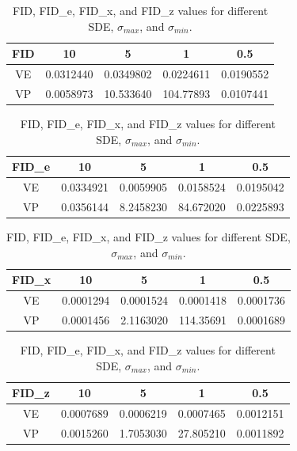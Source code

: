 \begin{table}[h]
    \centering
    \renewcommand{\arraystretch}{1.3} %
    \setlength{\tabcolsep}{8pt} %
    \begin{tabular}{|c|c|c|c|c|}
        \hline
        \textbf{FID}  & \textbf{10} & \textbf{5} & \textbf{1} & \textbf{0.5} \\
        \hline
        VE           & 0.0312440  & 0.0349802  & 0.0224611  & 0.0190552  \\
        VP           & 0.0058973 & 10.533640   & 104.77893 & 0.0107441  \\
        \hline
    \end{tabular}
    
    \vspace{0.6em}
    
    \begin{tabular}{|c|c|c|c|c|}
        \hline
        \textbf{FID\_e}  & \textbf{10} & \textbf{5} & \textbf{1} & \textbf{0.5} \\
        \hline
        VE               & 0.0334921  & 0.0059905  & 0.0158524  & 0.0195042  \\
        VP               & 0.0356144  & 8.2458230   & 84.672020   & 0.0225893  \\
        \hline
    \end{tabular}
    
    \vspace{0.6em}
    
    \begin{tabular}{|c|c|c|c|c|}
        \hline
        \textbf{FID\_x}  & \textbf{10} & \textbf{5} & \textbf{1} & \textbf{0.5} \\
        \hline
        VE               & 0.0001294  & 0.0001524  & 0.0001418  & 0.0001736  \\
        VP               & 0.0001456  & 2.1163020    & 114.35691   & 0.0001689  \\
        \hline
    \end{tabular}
    
    \vspace{0.6em}
    
    \begin{tabular}{|c|c|c|c|c|}
        \hline
        \textbf{FID\_z}  & \textbf{10} & \textbf{5} & \textbf{1} & \textbf{0.5} \\
        \hline
        VE               & 0.0007689  & 0.0006219  & 0.0007465  & 0.0012151   \\
        VP               & 0.0015260  & 1.7053030    & 27.805210    & 0.0011892   \\
        \hline
    \end{tabular}

    \caption{FID, FID\_e, FID\_x, and FID\_z values for different SDE, $\sigma_{max}$, and $\sigma_{min}$.}
    \label{tab:fid_values}
\end{table}



